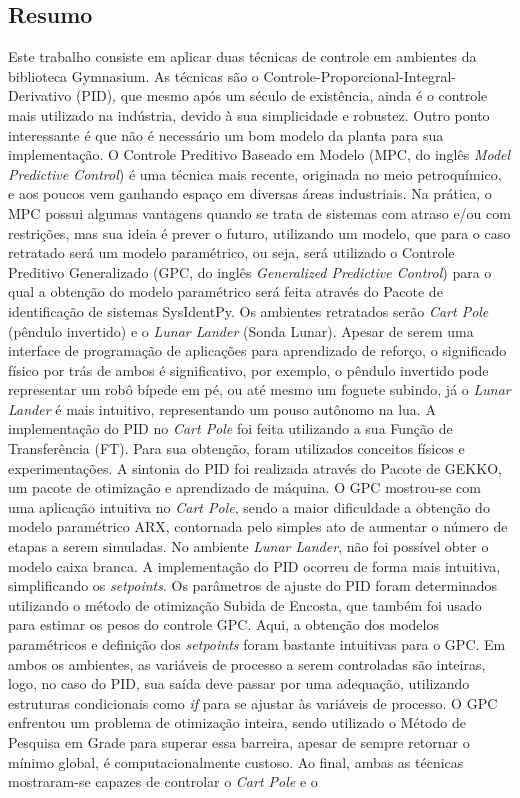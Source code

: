 \documentclass[12pt,           %
a4paper,                       %
openany,                       %
oneside,                       %
chapter=TITLE,                 %
english,                       %
spanish,                       %
brazil,                        %
sumario=tradicional]{abntex2}  %
\begin{document}
\begin{OnehalfSpace}                                %
\chapter*{Resumo}
\label{ch:resumo}


Este trabalho consiste em aplicar duas técnicas de controle em ambientes da biblioteca Gymnasium. As técnicas são o Controle-Proporcional-Integral-Derivativo (PID), que mesmo após um século de existência, ainda é o controle mais utilizado na indústria, devido à sua simplicidade e robustez. Outro ponto interessante é que não é necessário um bom modelo da planta para sua implementação. O Controle Preditivo Baseado em Modelo (MPC, do inglês \textit{Model Predictive Control}) é uma técnica mais recente, originada no meio petroquímico, e aos poucos vem ganhando espaço em diversas áreas industriais. Na prática, o MPC possui algumas vantagens quando se trata de sistemas com atraso e/ou com restrições, mas sua ideia é prever o futuro, utilizando um modelo, que para o caso retratado será um modelo paramétrico, ou seja, será utilizado o Controle Preditivo Generalizado (GPC, do inglês \textit{Generalized Predictive Control}) para o qual a obtenção do modelo paramétrico será feita através do Pacote de identificação de sistemas SysIdentPy. Os ambientes retratados serão \textit{Cart Pole} (pêndulo invertido) e o \textit{Lunar Lander} (Sonda Lunar). Apesar de serem uma interface de programação de aplicações para aprendizado de reforço, o significado físico por trás de ambos é significativo, por exemplo, o pêndulo invertido pode representar um robô bípede em pé, ou até mesmo um foguete subindo, já o \textit{Lunar Lander} é mais intuitivo, representando um pouso autônomo na lua. A implementação do PID no \textit{Cart Pole} foi feita utilizando a sua Função de Transferência (FT). Para sua obtenção, foram utilizados conceitos físicos e experimentações. A sintonia do PID foi realizada através do Pacote de GEKKO, um pacote de otimização e aprendizado de máquina. O GPC mostrou-se com uma aplicação intuitiva no \textit{Cart Pole}, sendo a maior dificuldade a obtenção do modelo paramétrico ARX, contornada pelo simples ato de aumentar o número de etapas a serem simuladas. No ambiente \textit{Lunar Lander}, não foi possível obter o modelo caixa branca. A implementação do PID ocorreu de forma mais intuitiva, simplificando os \textit{setpoints}. Os parâmetros de ajuste do PID foram determinados utilizando o método de otimização Subida de Encosta, que também foi usado para estimar os pesos do controle GPC. Aqui, a obtenção dos modelos  paramétricos e definição dos \textit{setpoints} foram bastante intuitivas para o GPC. Em ambos os ambientes, as variáveis de processo a serem controladas são inteiras, logo, no caso do PID, sua saída deve passar por uma adequação, utilizando estruturas condicionais como \textit{if} para se ajustar às variáveis de processo. O GPC enfrentou um problema de otimização inteira, sendo utilizado o Método de Pesquisa em Grade para superar essa barreira, apesar de sempre retornar o mínimo global, é computacionalmente custoso. Ao final, ambas as técnicas mostraram-se capazes de controlar o \textit{Cart Pole} e o 
\end{OnehalfSpace}
\end{document}

